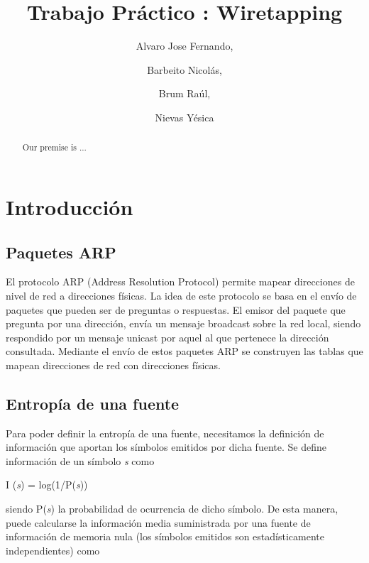 \documentclass[final,inline,narroweqnarray,a4paper]{ieee}
\begin{document}
\title[TP1: Wiretapping]{%
Trabajo Práctico : Wiretapping}

\author[Alvaro, Barbeito, Brum, Nievas]{%
	Alvaro Jose Fernando, 
	\and
	Barbeito Nicolás,
	\and
	Brum Raúl,
	\and
	Nievas Yésica
}

\maketitle

\begin{abstract}
Our premise is ...
\end{abstract}

\section{Introducción}\label{sec:intro}

\subsection{Paquetes ARP}
El protocolo ARP (Address Resolution Protocol) permite mapear direcciones de nivel de red a direcciones físicas. La idea de este protocolo se basa en el envío de paquetes que pueden ser de preguntas o respuestas. El emisor del paquete que pregunta por una dirección, envía un mensaje broadcast sobre la red local, siendo respondido por un mensaje unicast por aquel al que pertenece la dirección consultada. Mediante el envío de estos paquetes ARP se construyen las tablas que mapean direcciones de red con direcciones físicas.

\subsection{Entropía de una fuente}
Para poder definir la entropía de una fuente, necesitamos la definición de información que aportan los símbolos emitidos por dicha fuente. Se define información de un símbolo \textit{s} como 
\begin{center}
	I (\textit{s}) = log(1/P(\textit{s})) 
\end{center}
siendo P(\textit{s}) la probabilidad de ocurrencia de dicho símbolo.
De esta manera, puede calcularse la información media suministrada por una fuente de información de memoria nula (los símbolos emitidos son estadísticamente independientes) como 
\end{document}
